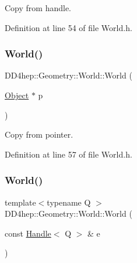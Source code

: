 Copy from handle. 



Definition at line 54 of file World.\+h.

\hypertarget{class_d_d4hep_1_1_geometry_1_1_world_aaa4f4f1b207ec4a4245047cb48e24681}{}\label{class_d_d4hep_1_1_geometry_1_1_world_aaa4f4f1b207ec4a4245047cb48e24681} 
\subsubsection{\texorpdfstring{World()}{World()}\hspace{0.1cm}{\footnotesize\ttfamily [4/5]}}
{\footnotesize\ttfamily D\+D4hep\+::\+Geometry\+::\+World\+::\+World (\begin{DoxyParamCaption}\item[{\hyperlink{class_d_d4hep_1_1_geometry_1_1_world_ade4542483ec578548cb266880f67e329}{Object} $\ast$}]{p }\end{DoxyParamCaption})\hspace{0.3cm}{\ttfamily [inline]}}



Copy from pointer. 



Definition at line 57 of file World.\+h.

\hypertarget{class_d_d4hep_1_1_geometry_1_1_world_a5694706fc2a89866e95051a13adf6135}{}\label{class_d_d4hep_1_1_geometry_1_1_world_a5694706fc2a89866e95051a13adf6135} 
\subsubsection{\texorpdfstring{World()}{World()}\hspace{0.1cm}{\footnotesize\ttfamily [5/5]}}
{\footnotesize\ttfamily template$<$typename Q $>$ \\
D\+D4hep\+::\+Geometry\+::\+World\+::\+World (\begin{DoxyParamCaption}\item[{const \hyperlink{class_d_d4hep_1_1_handle}{Handle}$<$ Q $>$ \&}]{e }\end{DoxyParamCaption})\hspace{0.3cm}{\ttfamily [inline]}}



